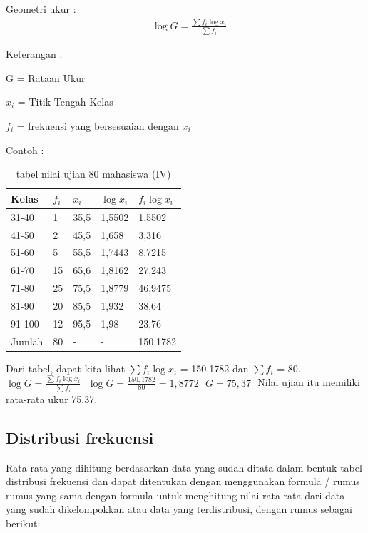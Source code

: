 \documentclass[11pt,fleqn]{book} %
\begin{document}
{\begin{theorem}[Mean]
Geometri ukur :
\begin{align}
& \log G = \frac{\sum f_{i}\log x_{i}}{\sum f_{i}} 
\end{align}
\end{theorem}

Keterangan :

G = Rataan Ukur

$x_{i} $ = Titik Tengah Kelas

$f_{i} $ = frekuensi yang bersesuaian dengan $ x_{i}$

Contoh : 

\begin{table}[h]
\centering
\begin{tabular}{l l l l l}
\toprule
\textbf{Kelas} & \textbf{$f_{i}$} & \textbf{$ x_{i}$} & \textbf{$\log x_{i}$} & \textbf{$f_{i} \log x_{i}$}\\
\midrule
31-40 & 1 & 35,5 & 1,5502 & 1,5502\\
41-50 & 2 & 45,5 & 1,658 & 3,316\\
51-60 & 5 & 55,5 & 1,7443 & 8,7215\\
61-70 & 15 & 65,6 & 1,8162 & 27,243\\
71-80 & 25 & 75,5 & 1,8779 & 46,9475\\
81-90 & 20 & 85,5 & 1,932 & 38,64\\
91-100 & 12 & 95,5 & 1,98 & 23,76\\
Jumlah & 80 & - & - &150,1782\\
\bottomrule
\end{tabular}
\caption{tabel nilai ujian 80 mahasiswa (IV)}
\end{table}

Dari tabel, dapat kita lihat $\sum f_{i} \log x_{i}$  = 150,1782 dan $\sum f_{i}$  = 80.
$ 
$
$ \log G = \frac{\sum f_{i}\log x_{i}}{\sum f_{i}}$
$ 
$
$ \log G = \frac{150,1782}{80} = 1,8772$
$ 
$
$ G = 75,37 $
$ 
$
Nilai ujian itu memiliki rata-rata ukur 75,37.


\subsection{Distribusi frekuensi}
Rata-rata yang dihitung berdasarkan data yang sudah ditata dalam bentuk tabel distribusi frekuensi dan dapat ditentukan dengan menggunakan formula / rumus rumus yang sama dengan formula untuk menghitung nilai rata-rata dari data yang sudah dikelompokkan atau data yang terdistribusi, dengan rumus sebagai berikut:

}
\end{document}
